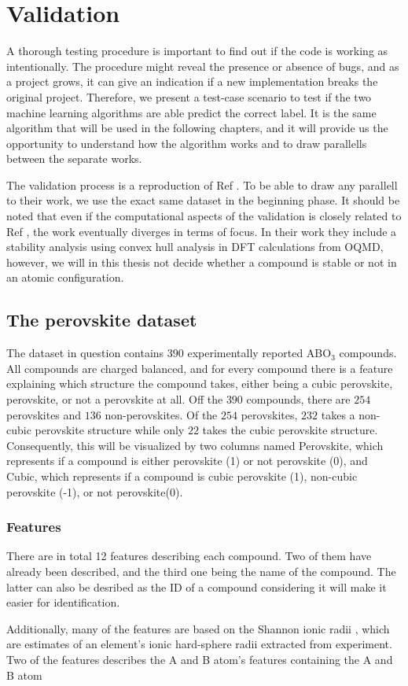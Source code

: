 \chapter{Validation}

A thorough testing procedure is important to find out if the code is working as intentionally. The procedure might reveal the presence or absence of bugs, and as a project grows, it can give an indication if a new implementation breaks the original project. Therefore, we present a test-case scenario to test if the two machine learning algorithms are able predict the correct label. It is the same algorithm that will be used in the following chapters, and it will provide us the opportunity to understand how the algorithm works and to draw parallells between the separate works.

The validation process is a reproduction of Ref \cite{Balachandran2018}. To be able to draw any parallell to their work, we use the exact same dataset in the beginning phase. It should be noted that even if the computational aspects of the validation is closely related to Ref \cite{Balachandran2018}, the work eventually diverges in terms of focus. In their work they include a stability analysis using convex hull analysis in DFT calculations from OQMD, however, we will in this thesis not decide whether a compound is stable or not in an atomic configuration.

\section{The perovskite dataset}

The dataset in question contains $390$ experimentally reported ABO$_3$ compounds. All compounds are charged balanced, and for every compound there is a feature explaining which structure the compound takes, either being a cubic perovskite, perovskite, or not a perovskite at all. Off the $390$ compounds, there are $254$ perovskites and $136$ non-perovskites. Of the $254$ perovskites, $232$ takes a non-cubic perovskite structure while only $22$ takes the cubic perovskite structure. Consequently, this will be visualized by two columns named Perovskite, which represents if a compound is either perovskite (1) or not perovskite (0), and Cubic, which represents if a compound is cubic perovskite (1), non-cubic perovskite (-1), or not perovskite(0).

\subsection{Features}

There are in total 12 features describing each compound. Two of them have already been described, and the third one being the name of the compound. The latter can also be desribed as the ID of a compound considering it will make it easier for identification.

Additionally, many of the features are based on the Shannon ionic radii \cite{Shannon1976}, which are estimates of an element's ionic hard-sphere radii extracted from experiment. Two of the features describes the A and B atom's features containing the A and B atom
